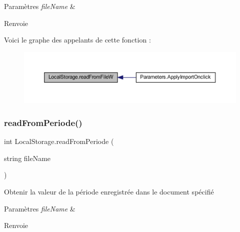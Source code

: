 \begin{DoxyParams}{Paramètres}
{\em file\+Name} & \\
\hline
\end{DoxyParams}
\begin{DoxyReturn}{Renvoie}

\end{DoxyReturn}
Voici le graphe des appelants de cette fonction \+:\nopagebreak
\begin{figure}[H]
\begin{center}
\leavevmode
\includegraphics[width=350pt]{class_local_storage_aef684ee38f8d4dccf157503ec6d04a7a_icgraph}
\end{center}
\end{figure}
\mbox{\label{class_local_storage_a8e862054e8b3f3c33dd64ed44d5983c4}} 
\subsubsection{\texorpdfstring{read\+From\+Periode()}{readFromPeriode()}}
{\footnotesize\ttfamily int Local\+Storage.\+read\+From\+Periode (\begin{DoxyParamCaption}\item[{string}]{file\+Name }\end{DoxyParamCaption})\hspace{0.3cm}{\ttfamily [inline]}}



Obtenir la valeur de la période enregistrée dans le document spécifié 


\begin{DoxyParams}{Paramètres}
{\em file\+Name} & \\
\hline
\end{DoxyParams}
\begin{DoxyReturn}{Renvoie}

\end{DoxyReturn}
\mbox{\label{class_local_storage_afbd7328c28fa47b11fcc174da3cc8ec1}} 
